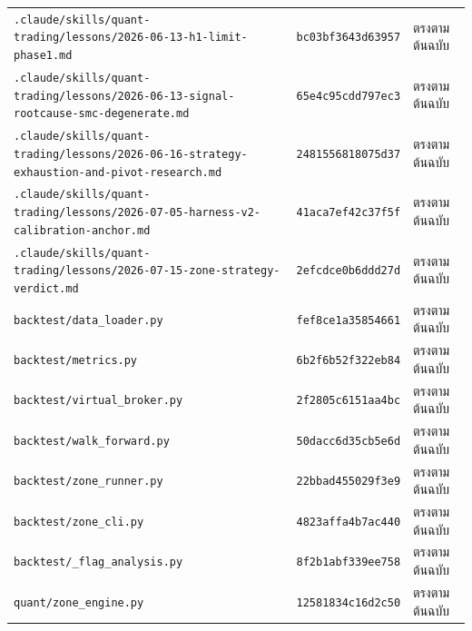 {\begin{longtable}{@{}>{\raggedright\arraybackslash}p{8.6cm}p{2.7cm}>{\raggedright\arraybackslash}p{3.4cm}@{}}
\texttt{.claude/\allowbreak{}skills/\allowbreak{}quant-\allowbreak{}trading/\allowbreak{}lessons/\allowbreak{}2026-\allowbreak{}06-\allowbreak{}13-\allowbreak{}h1-\allowbreak{}limit-\allowbreak{}phase1.md} & \texttt{bc03bf3643d63957} & ตรงตามต้นฉบับ \\
\texttt{.claude/\allowbreak{}skills/\allowbreak{}quant-\allowbreak{}trading/\allowbreak{}lessons/\allowbreak{}2026-\allowbreak{}06-\allowbreak{}13-\allowbreak{}signal-\allowbreak{}rootcause-\allowbreak{}smc-\allowbreak{}degenerate.md} & \texttt{65e4c95cdd797ec3} & ตรงตามต้นฉบับ \\
\texttt{.claude/\allowbreak{}skills/\allowbreak{}quant-\allowbreak{}trading/\allowbreak{}lessons/\allowbreak{}2026-\allowbreak{}06-\allowbreak{}16-\allowbreak{}strategy-\allowbreak{}exhaustion-\allowbreak{}and-\allowbreak{}pivot-\allowbreak{}research.md} & \texttt{2481556818075d37} & ตรงตามต้นฉบับ \\
\texttt{.claude/\allowbreak{}skills/\allowbreak{}quant-\allowbreak{}trading/\allowbreak{}lessons/\allowbreak{}2026-\allowbreak{}07-\allowbreak{}05-\allowbreak{}harness-\allowbreak{}v2-\allowbreak{}calibration-\allowbreak{}anchor.md} & \texttt{41aca7ef42c37f5f} & ตรงตามต้นฉบับ \\
\texttt{.claude/\allowbreak{}skills/\allowbreak{}quant-\allowbreak{}trading/\allowbreak{}lessons/\allowbreak{}2026-\allowbreak{}07-\allowbreak{}15-\allowbreak{}zone-\allowbreak{}strategy-\allowbreak{}verdict.md} & \texttt{2efcdce0b6ddd27d} & ตรงตามต้นฉบับ \\
\texttt{backtest/\allowbreak{}data\_loader.py} & \texttt{fef8ce1a35854661} & ตรงตามต้นฉบับ \\
\texttt{backtest/\allowbreak{}metrics.py} & \texttt{6b2f6b52f322eb84} & ตรงตามต้นฉบับ \\
\texttt{backtest/\allowbreak{}virtual\_broker.py} & \texttt{2f2805c6151aa4bc} & ตรงตามต้นฉบับ \\
\texttt{backtest/\allowbreak{}walk\_forward.py} & \texttt{50dacc6d35cb5e6d} & ตรงตามต้นฉบับ \\
\texttt{backtest/\allowbreak{}zone\_runner.py} & \texttt{22bbad455029f3e9} & ตรงตามต้นฉบับ \\
\texttt{backtest/\allowbreak{}zone\_cli.py} & \texttt{4823affa4b7ac440} & ตรงตามต้นฉบับ \\
\texttt{backtest/\allowbreak{}\_flag\_analysis.py} & \texttt{8f2b1abf339ee758} & ตรงตามต้นฉบับ \\
\texttt{quant/\allowbreak{}zone\_engine.py} & \texttt{12581834c16d2c50} & ตรงตามต้นฉบับ \\

\end{longtable}}
